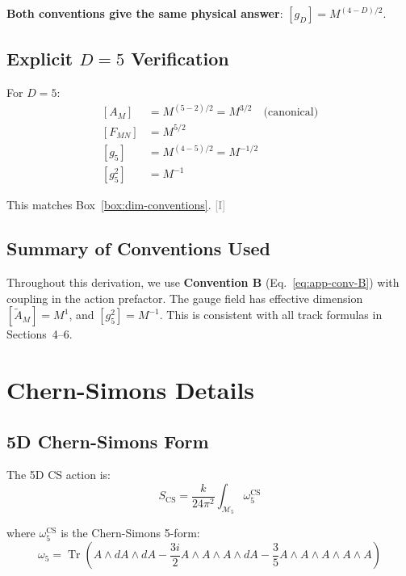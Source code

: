 \documentclass[11pt,a4paper]{article}
\newcommand{\tagI}{\textcolor{gray}{[I]}}
\DeclareMathOperator{\Tr}{Tr}
\begin{document}
\textbf{Both conventions give the same physical answer}: $[g_D] = M^{(4-D)/2}$.

\subsection{Explicit $D=5$ Verification}

For $D=5$:
\begin{align}
\label{eq:app-5d-A}
[A_M] &= M^{(5-2)/2} = M^{3/2} \quad \text{(canonical)} \\
\label{eq:app-5d-F}
[F_{MN}] &= M^{5/2} \\
\label{eq:app-5d-g}
[g_5] &= M^{(4-5)/2} = M^{-1/2} \\
\label{eq:app-5d-g2}
[g_5^2] &= M^{-1}
\end{align}

This matches Box~\ref{box:dim-conventions}. \tagI

\subsection{Summary of Conventions Used}

Throughout this derivation, we use \textbf{Convention B} (Eq.~\ref{eq:app-conv-B})
with coupling in the action prefactor. The gauge field has effective dimension
$[\tilde{A}_M] = M^1$, and $[g_5^2] = M^{-1}$. This is consistent with all
track formulas in Sections~4--6.

\section{Chern-Simons Details}
\label{app:cs}

\subsection{5D Chern-Simons Form}

The 5D CS action is:
\begin{equation}
\label{eq:app-cs}
S_{\text{CS}} = \frac{k}{24\pi^2} \int_{\mathcal{M}_5} \omega_5^{\text{CS}}
\end{equation}

where $\omega_5^{\text{CS}}$ is the Chern-Simons 5-form:
\begin{equation}
\label{eq:app-omega5}
\omega_5 = \Tr\left(A \wedge dA \wedge dA - \frac{3i}{2} A \wedge A \wedge A \wedge dA
- \frac{3}{5} A \wedge A \wedge A \wedge A \wedge A\right)
\end{equation}
\end{document}
